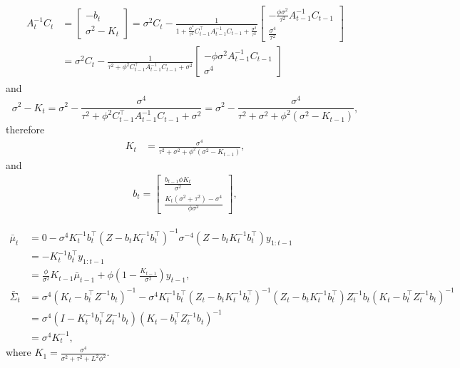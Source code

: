 \begin{align}
\begin{split}
A_{t}^{-1}C_{t} &= \left[ \begin{array}{c} -b_{t} \\ \sigma^2-K_{t}\end{array} \right] = \sigma^2C_{t}-\frac{1}{1+\frac{\phi^2}{\tau^2} C_{t-1}^\top A_{t-1}^{-1}C_{t-1}+\frac{\sigma^2}{\tau^2}} \left[\begin{array}{c} -\frac{\phi\sigma^2}{\tau^2} A_{t-1}^{-1}C_{t-1} \\\frac{\sigma^4}{\tau^2} \end{array}\right] \\
&= \sigma^2C_{t}-\frac{1}{\tau^2+\phi^2C_{t-1}^\top A_{t-1}^{-1}C_{t-1}+\sigma^2} \left[\begin{array}{c} -\phi\sigma^2 A_{t-1}^{-1}C_{t-1} \\ \sigma^4 \end{array}\right]
\end{split}
\end{align}
and
\begin{equation*}
\sigma^2-K_{t} = \sigma^2 - \frac{\sigma^4}{\tau^2+\phi^2C_{t-1}^\top A_{t-1}^{-1}C_{t-1}+\sigma^2} = \sigma^2 - \frac{\sigma^4}{\tau^2+\sigma^2+\phi^2(\sigma^2-K_{t-1})},
\end{equation*}
therefore
\begin{align}
K_{t}  &=\frac{\sigma^4}{\tau^2+\sigma^2+\phi^2(\sigma^2-K_{t-1})},
\end{align}
and
\begin{align*}b_{t} = 
\begin{bmatrix}
\frac{b_{t-1}\phi K_{t}}{\sigma^2} \\ \frac{K_{t}(\sigma^2+\tau^2)-\sigma^4 }{\phi\sigma^2}
\end{bmatrix},
\end{align*}

\begin{align*}
\bar{\mu}_{t}      &= 0-\sigma^4 K_t^{-1}b_t^\top (Z-b_tK_t^{-1}b_t^\top)^{-1} \sigma^{-4} (Z-b_tK_t^{-1}b_t^\top) y_{1:t-1} \\
					 & =-K_t^{-1}b_t^\top y_{1:t-1} \\
					 & = \frac{\phi}{\sigma^2}K_{t-1}\bar{\mu}_{t-1} + \phi (1 - \frac{K_{t-1}}{\sigma^2})y_{t-1}, \\
\bar{\Sigma}_{t} &= \sigma^4(K_t-b_t^\top Z^{-1}b_t)^{-1}- \sigma^4K_t^{-1}b_t^\top (Z_t-b_tK_t^{-1}b_t^\top)^{-1} (Z_t-b_tK_t^{-1}b_t^\top)Z_t^{-1}b_t(K_t-b_t^\top Z_t^{-1}b_t)^{-1}\\
                     & = \sigma^4(I-K_t^{-1}b_t^\top Z_t^{-1}b_t)(K_t-b_t^\top Z_t^{-1}b_t)^{-1} \\
                     & = \sigma^4K_{t}^{-1},
\end{align*}
where $K_1=\frac{\sigma^4}{\sigma^2+\tau^2+L^2\phi^2}$.




